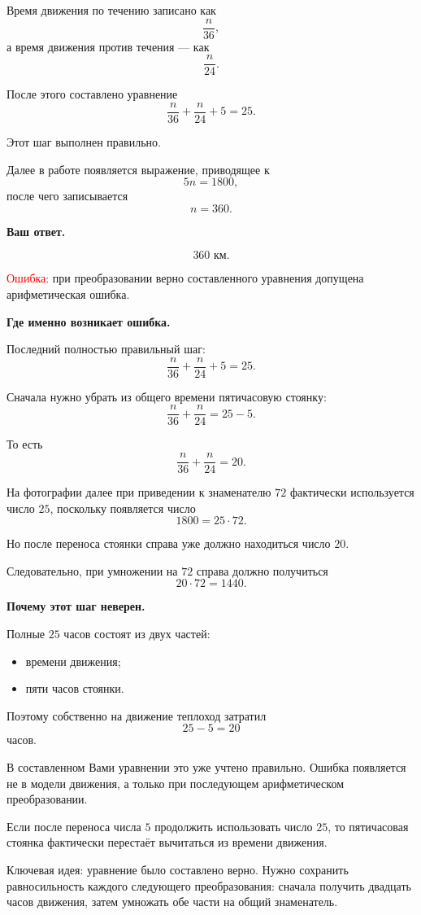 \documentclass[12pt,a4paper]{article}
\newcommand{\errorlabel}[1]{\textcolor{red}{Ошибка:} #1}
\newcommand{\keyidea}[1]{\textcolor{blue!60!black}{Ключевая идея:} #1}
\begin{document}
Время движения по течению записано как
\[
\frac{n}{36},
\]
а время движения против течения --- как
\[
\frac{n}{24}.
\]

После этого составлено уравнение
\[
\frac{n}{36}+\frac{n}{24}+5=25.
\]

Этот шаг выполнен правильно.

Далее в работе появляется выражение, приводящее к
\[
5n=1800,
\]
после чего записывается
\[
n=360.
\]

\textbf{Ваш ответ.}

\[
360\text{ км}.
\]

\errorlabel{ при преобразовании верно составленного уравнения допущена арифметическая ошибка.}

\textbf{Где именно возникает ошибка.}

Последний полностью правильный шаг:
\[
\frac{n}{36}+\frac{n}{24}+5=25.
\]

Сначала нужно убрать из общего времени пятичасовую стоянку:
\[
\frac{n}{36}+\frac{n}{24}=25-5.
\]

То есть
\[
\frac{n}{36}+\frac{n}{24}=20.
\]

На фотографии далее при приведении к знаменателю $72$ фактически
используется число $25$, поскольку появляется число
\[
1800=25\cdot72.
\]

Но после переноса стоянки справа уже должно находиться число $20$.

Следовательно, при умножении на $72$ справа должно получиться
\[
20\cdot72=1440.
\]

\textbf{Почему этот шаг неверен.}

Полные $25$ часов состоят из двух частей:

\begin{itemize}
    \item времени движения;
    \item пяти часов стоянки.
\end{itemize}

Поэтому собственно на движение теплоход затратил
\[
25-5=20
\]
часов.

В составленном Вами уравнении это уже учтено правильно. Ошибка появляется
не в модели движения, а только при последующем арифметическом преобразовании.

Если после переноса числа $5$ продолжить использовать число $25$, то
пятичасовая стоянка фактически перестаёт вычитаться из времени движения.

\keyidea{ уравнение было составлено верно. Нужно сохранить равносильность каждого следующего преобразования: сначала получить двадцать часов движения, затем умножать обе части на общий знаменатель.}
\end{document}

